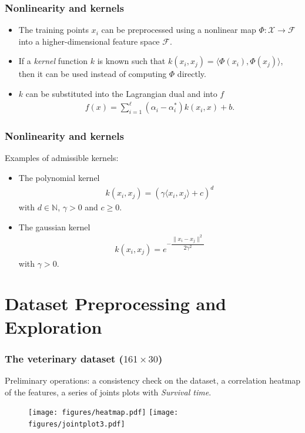 \documentclass[table]{beamer}
\newcommand*{\sectionp}{\usebeamertemplate*{section p}}
\newcommand{\nologo}{\setbeamertemplate{logo}{}}
\begin{document}
\begin{frame}
\frametitle{Nonlinearity and kernels}
\begin{itemize}
\item The training points $ x_{i} $ can be preprocessed using a nonlinear map $ \Phi : \mathcal{X} \rightarrow \mathcal{F} $ into a higher-dimensional feature space $ \mathcal{F} $.
\item If a \textit{kernel} function $ k $ is known such that $ k(x_{i},x_{j}) = \langle\Phi (x_{i}),\Phi (x_{j})\rangle $, then it can be used instead of computing $ \Phi $ directly.
\item $k$ can be substituted into the Lagrangian dual and into $f$
\begin{align*}
f(x) = \sum_{i=1}^{\ell}(\alpha_{i}-\alpha_{i}^{*})k(x_{i},x) + b \text{.}
\end{align*}
\end{itemize}
\end{frame}

\begin{frame}
\frametitle{Nonlinearity and kernels}
Examples of admissible kernels:
\begin{itemize}
\item The polynomial kernel \begin{align*}
k(x_{i},x_{j}) = (\gamma\langle x_{i},x_{j} \rangle + c)^{d}
\end{align*}
with $ d \in \mathbb{N} $, $ \gamma > 0 $ and $ c \geq 0 $.
\item The gaussian kernel \begin{align*}
k(x_{i},x_{j}) = e^{-\dfrac{\| x_{i}-x_{j} \|^{2}}{2\gamma^{2}}}
\end{align*}
with $ \gamma > 0 $.
\end{itemize}
\end{frame}

\section{Dataset Preprocessing and Exploration}
\frame{\sectionp}

{\nologo
\begin{frame}
\frametitle{The veterinary dataset ($ 161 \times 30$)}
Preliminary operations: a consistency check on the dataset, a correlation heatmap of the features, a series of joints plots with \textit{Survival time}.
\begin{figure}[h]
  \vspace{-0.2cm}
  \centering
  	\texttt{[image: figures/heatmap.pdf]}
  	\texttt{[image: figures/jointplot3.pdf]}
\end{figure}
\end{frame}}
\end{document}
